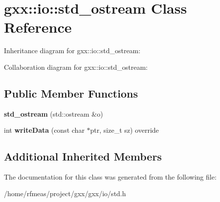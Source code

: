 \hypertarget{classgxx_1_1io_1_1std__ostream}{}\section{gxx\+:\+:io\+:\+:std\+\_\+ostream Class Reference}
\label{classgxx_1_1io_1_1std__ostream}


Inheritance diagram for gxx\+:\+:io\+:\+:std\+\_\+ostream\+:


Collaboration diagram for gxx\+:\+:io\+:\+:std\+\_\+ostream\+:
\subsection*{Public Member Functions}
\begin{DoxyCompactItemize}
\item 
{\bfseries std\+\_\+ostream} (std\+::ostream \&o)\hypertarget{classgxx_1_1io_1_1std__ostream_a8cb4816d6c5d100816583ce27ecc8d3b}{}\label{classgxx_1_1io_1_1std__ostream_a8cb4816d6c5d100816583ce27ecc8d3b}

\item 
int {\bfseries write\+Data} (const char $\ast$ptr, size\+\_\+t sz) override\hypertarget{classgxx_1_1io_1_1std__ostream_a2c983c74ba9a0eb997aee3eb213511c6}{}\label{classgxx_1_1io_1_1std__ostream_a2c983c74ba9a0eb997aee3eb213511c6}

\end{DoxyCompactItemize}
\subsection*{Additional Inherited Members}


The documentation for this class was generated from the following file\+:\begin{DoxyCompactItemize}
\item 
/home/rfmeas/project/gxx/gxx/io/std.\+h\end{DoxyCompactItemize}
